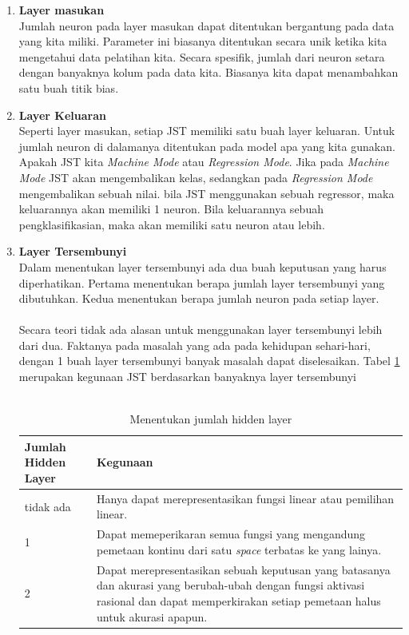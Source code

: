 \begin{enumerate}
\item\textbf{Layer masukan}\\Jumlah neuron pada layer masukan dapat ditentukan bergantung pada data yang kita miliki. Parameter ini biasanya ditentukan secara unik ketika kita mengetahui data pelatihan kita. Secara spesifik, jumlah dari neuron setara dengan banyaknya kolum pada data kita. Biasanya kita dapat menambahkan satu buah titik bias.
\item\textbf{Layer Keluaran}\\Seperti layer masukan, setiap JST memiliki satu buah layer keluaran. Untuk jumlah neuron di dalamanya ditentukan pada model apa yang kita gunakan. Apakah JST kita \textit{Machine Mode} atau \textit{Regression Mode}. Jika pada \textit{Machine Mode} JST akan mengembalikan kelas, sedangkan pada \textit{Regression Mode} mengembalikan sebuah nilai. bila JST menggunakan sebuah regressor, maka keluarannya akan memiliki 1 neuron. Bila keluarannya sebuah pengklasifikasian, maka akan memiliki satu neuron atau lebih.
\item\textbf{Layer Tersembunyi}\\Dalam menentukan layer tersembunyi ada dua buah keputusan yang harus diperhatikan. Pertama menentukan berapa jumlah layer tersembunyi yang dibutuhkan. Kedua menentukan berapa jumlah neuron pada setiap layer.\\\\ 
Secara teori tidak ada alasan untuk menggunakan layer tersembunyi lebih dari dua. Faktanya pada masalah yang ada pada kehidupan sehari-hari, dengan 1 buah layer tersembunyi banyak masalah dapat diselesaikan. Tabel \ref{table:jmlhHiddenLayer} merupakan kegunaan JST berdasarkan banyaknya layer tersembunyi\\\\
\begin{table}
\centering
\caption{Menentukan jumlah hidden layer}
\label{table:jmlhHiddenLayer}
\begin{tabular}{|l|p{12cm}|}
\hline
Jumlah Hidden Layer & Kegunaan \\\hline
tidak ada & Hanya dapat merepresentasikan fungsi linear atau pemilihan linear.\\\hline
1 & Dapat memeperikaran semua fungsi yang mengandung pemetaan kontinu dari satu \textit{space} terbatas ke yang lainya.\\\hline
2 & Dapat merepresentasikan sebuah keputusan yang  batasanya dan akurasi yang berubah-ubah dengan fungsi aktivasi rasional dan dapat memperkirakan setiap pemetaan halus untuk akurasi apapun.\\\hline

\end{tabular}
\end{table}
\end{enumerate}
